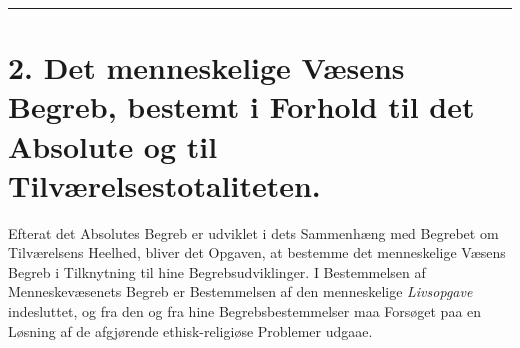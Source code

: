 \begin{center}\rule{2cm}{0.4pt}\end{center}

\section*{2. Det menneskelige Væsens Begreb, bestemt i Forhold til det Absolute og til Tilværelsestotaliteten.}

Efterat det Absolutes Begreb er udviklet i dets Sammenhæng med Begrebet om
Tilværelsens Heelhed, bliver det Opgaven, at bestemme det menneskelige Væsens
Begreb i Tilknytning til hine Begrebsudviklinger. I Bestemmelsen af
Menneskevæsenets Begreb er Bestemmelsen af den menneskelige \emph{Livsopgave}
indesluttet, og fra den og fra hine Begrebsbestemmelser maa Forsøget paa en
Løsning af de afgjørende ethisk-religiøse Problemer udgaae.

